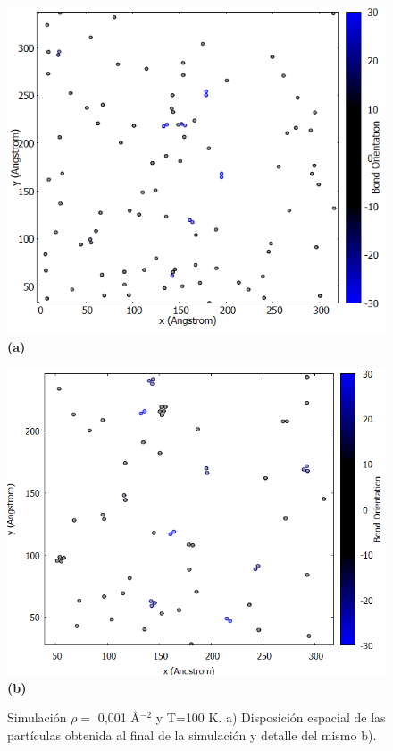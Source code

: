 \begin{figure}[H]
	\centering
	\begin{minipage}[b]{0.42\textwidth}
		\centering
		\includegraphics[width=1\textwidth]{grafico_3x04_0.001-1_dinamica.png}
		\textbf{(a)}
	\end{minipage}%
	\hfill
	\begin{minipage}[b]{0.45\textwidth}
		\centering
		\includegraphics[width=1\textwidth]{grafico_3x06_0.001-1_dinamica_zoom.png}
		\textbf{(b)}
	\end{minipage}
	
	\caption{\footnotesize Simulación  $\rho=$ 0,001 \AA$^{-2}$ y  T=100 K. a) Disposición espacial de las partículas obtenida al final de la simulación y detalle del mismo b).}
	\label{fig:d001t1}
\end{figure}

